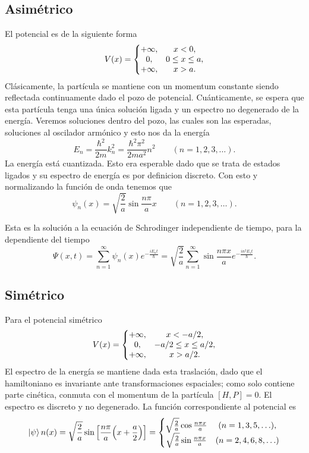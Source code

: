 \subsection{Asimétrico}
El potencial es de la siguiente forma
    \begin{equation}
        V(x) = \left\{ \mqty{ +\infty , & x<0, \\ 0, & 0 \leq x \leq a, \\ +\infty, & x > a. } \right.
    \end{equation}
Clásicamente, la partícula se mantiene con un momentum constante siendo reflectada continuamente dado el pozo de potencial. Cuánticamente, se espera que esta partícula tenga una única solución ligada y un espectro no degenerado de la energía. Veremos soluciones dentro del pozo, las cuales son las esperadas, soluciones al oscilador armónico y esto nos da la energía
    \begin{equation}
        E_n = \frac{\hbar ^2}{2m} k_n ^2 = \frac{\hbar ^2 \pi ^2}{2m a^2} n^2 \qquad (n = 1,2,3,\ldots).
    \end{equation}
La energía está cuantizada. Esto era esperable dado que se trata de estados ligados y su espectro de energía es por definicion discreto. Con esto y normalizando la función de onda tenemos que
    \begin{equation}
        \boxed{ \psi _n (x) = \sqrt{\frac{2}{a}} \sin{\frac{n\pi}{a} x} \qquad (n = 1,2,3,\ldots). } 
    \end{equation}


Esta es la solución a la ecuación de Schrodinger independiente de tiempo, para la dependiente del tiempo
\begin{equation}
	\Psi (x,t) = \sum _{n=1} ^\infty \psi _n (x) e^{-\frac{iE_n t}{\hbar}} = \sqrt{\frac{2}{a}} \sum _{n=1} ^\infty \sin{\frac{n\pi x}{a}} e^{-\frac{in^2 E_1 t}{\hbar}}.
\end{equation}




\subsection{Simétrico}
Para el potencial simétrico
	\begin{equation}
		V(x) = \left\{ \mqty{ +\infty , & x<-a/2, \\ 0, & -a/2 \leq x \leq a/2, \\ +\infty, & x > a/2. } \right.
	\end{equation}
El espectro de la energía se mantiene dada esta traslación, dado que el hamiltoniano es invariante ante transformaciones espaciales; como solo contiene parte cinética, conmuta con el momentum de la partícula $[H,P] = 0$. El espectro es discreto y no degenerado. La función correspondiente al potencial es
\begin{equation}
	\pk{n} (x) = \sqrt{\frac{2}{a}} \sin{\qty[\frac{n\pi }{a} \qty(x + \frac{a}{2})]} = \left\{ \mqty{\sqrt{\frac{2}{a}} \cos{\frac{n\pi x}{a}} & (n = 1,3,5,\ldots), \\ \sqrt{\frac{2}{a}} \sin{\frac{n\pi x}{a}} & (n = 2,4,6,8,\ldots) } \right.
\end{equation}


